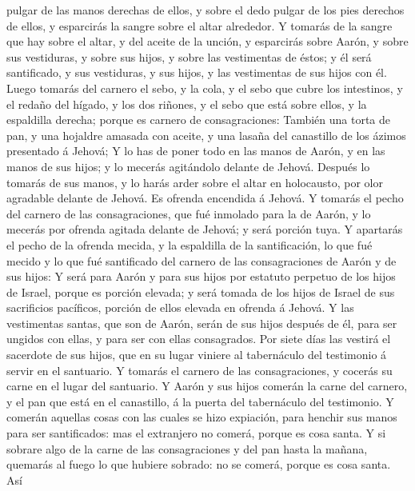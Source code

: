 pulgar de las manos derechas de ellos, y sobre el dedo pulgar de los
pies derechos de ellos, y esparcirás la sangre sobre el altar alrededor.
 Y tomarás de la sangre que hay sobre el altar, y del
aceite de la unción, y esparcirás sobre Aarón, y sobre sus vestiduras, y
sobre sus hijos, y sobre las vestimentas de éstos; y él será
santificado, y sus vestiduras, y sus hijos, y las vestimentas de sus
hijos con él.  Luego tomarás del carnero el sebo, y la
cola, y el sebo que cubre los intestinos, y el redaño del hígado, y los
dos riñones, y el sebo que está sobre ellos, y la espaldilla derecha;
porque es carnero de consagraciones:  También una torta
de pan, y una hojaldre amasada con aceite, y una lasaña del canastillo
de los ázimos presentado á Jehová;  Y lo has de poner
todo en las manos de Aarón, y en las manos de sus hijos; y lo mecerás
agitándolo delante de Jehová.  Después lo tomarás de sus
manos, y lo harás arder sobre el altar en holocausto, por olor agradable
delante de Jehová. Es ofrenda encendida á Jehová.  Y
tomarás el pecho del carnero de las consagraciones, que fué inmolado
para la de Aarón, y lo mecerás por ofrenda agitada delante de Jehová; y
será porción tuya.  Y apartarás el pecho de la ofrenda
mecida, y la espaldilla de la santificación, lo que fué mecido y lo que
fué santificado del carnero de las consagraciones de Aarón y de sus
hijos:  Y será para Aarón y para sus hijos por estatuto
perpetuo de los hijos de Israel, porque es porción elevada; y será
tomada de los hijos de Israel de sus sacrificios pacíficos, porción de
ellos elevada en ofrenda á Jehová.  Y las vestimentas
santas, que son de Aarón, serán de sus hijos después de él, para ser
ungidos con ellas, y para ser con ellas consagrados.  Por
siete días las vestirá el sacerdote de sus hijos, que en su lugar
viniere al tabernáculo del testimonio á servir en el santuario.
 Y tomarás el carnero de las consagraciones, y cocerás su
carne en el lugar del santuario.  Y Aarón y sus hijos
comerán la carne del carnero, y el pan que está en el canastillo, á la
puerta del tabernáculo del testimonio.  Y comerán
aquellas cosas con las cuales se hizo expiación, para henchir sus manos
para ser santificados: mas el extranjero no comerá, porque es cosa
santa.  Y si sobrare algo de la carne de las
consagraciones y del pan hasta la mañana, quemarás al fuego lo que
hubiere sobrado: no se comerá, porque es cosa santa.  Así
